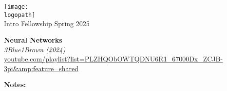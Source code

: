 \documentclass[12pt]{article}
\def\logopath{../assets/caiac_logo.png}  %
\def\programlongname{
    Intro Fellowship
}
\def\timeperiod{
    Spring 2025
}
\begin{document}
\thispagestyle{empty} %

\begin{center}
    \texttt{[image: \\logopath]}\\
    \vspace{0.2em}
    {\color{primaryFaded}\programlongname\color{primaryFaded}\timeperiod}
\end{center}

\vspace{1em}

% 
% 
\noindent\textbf{ Neural Networks }\\
\textit{ 3Blue1Brown (2024) }\\
{\small \url{ youtube.com/playlist?list=PLZHQObOWTQDNU6R1_67000Dx_ZCJB-3pi&amp;feature=shared }}

\vspace{1em}
% 
% 
\textbf{Notes:}
% 
\end{document}
